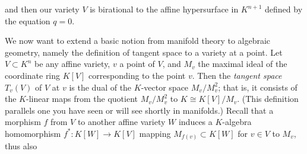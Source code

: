 and then our variety $V$ is birational to the affine hypersurface in $K^{n+1}$ defined by the equation $q=0$.  

We now want to extend a basic notion from manifold theory to algebraic geometry, namely the definition of tangent space to a variety at a point.  Let $V\subset K^n$ be any affine variety, $v$ a point of $V$, and $M_v$ the maximal ideal of the coordinate ring $K[V]$ corresponding to the point $v$.  Then the {\sl tangent space} $T_v(V)$ of $V$ at $v$ is the dual of the $K$-vector space
$M_v/M_v^2$; that is, it consists of the $K$-linear maps from the quotient $M_v/M_v^2$ to $K\cong K[V]/M_v$.  (This definition parallels one you have seen or will see shortly in manifolds.)  Recall that a morphism $f$ from $V$ to another affine variety $W$ induces a $K$-algebra homomorphism
$f^*:K[W]\rightarrow K[V]$ mapping $M_{f(v)}\subset K[W]$ for $v\in V$ to $M_v$, thus also
